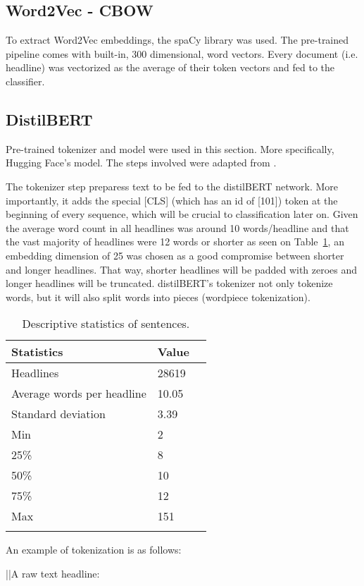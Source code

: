 \subsection{Word2Vec - CBOW}

To extract Word2Vec embeddings, the spaCy library was used. The pre-trained pipeline  comes with built-in, 300 dimensional, word vectors. Every document (i.e. headline) was vectorized as the average of their token vectors \citep{spacy} and fed to the classifier.

 \subsection{DistilBERT}
 
 Pre-trained tokenizer and model were used in this section. More specifically, Hugging Face's  model. The steps involved were adapted from \cite{alammar2019}.
 
 The tokenizer step preparess text to be fed to the distilBERT network. More importantly, it adds the special [CLS] (which has an id of [101]) token at the beginning of every sequence, which will be crucial to classification later on. Given the average word count in all headlines was around 10 words/headline and that the vast majority of headlines were 12 words or shorter as seen on Table~\ref{table:stats}, an embedding dimension of 25 was chosen as a good compromise between shorter and longer headlines. That way, shorter headlines will be padded with zeroes and longer headlines will be truncated. distilBERT's tokenizer not only tokenize words, but it will also split words into pieces (wordpiece tokenization).
 
 \begin{longtable}[]{p{5cm}lp{}}
 	\toprule
 	\centering Statistics & \centering Value \tabularnewline
 	\midrule
 	\endhead
 	Headlines & 28619 \tabularnewline
 	Average words per headline & 10.05 \tabularnewline
 	Standard deviation & 3.39  \tabularnewline
 	Min & 2 \tabularnewline
 	25\% & 8  \tabularnewline
 	50\% & 10 \tabularnewline
 	75\% & 12 \tabularnewline
 	Max & 151 \tabularnewline
 	
 	\bottomrule
 	\caption{Descriptive statistics of sentences.}
 	\label{table:stats}
 \end{longtable}
 
 
 An example of tokenization is as follows:
 
||A raw text headline: 

